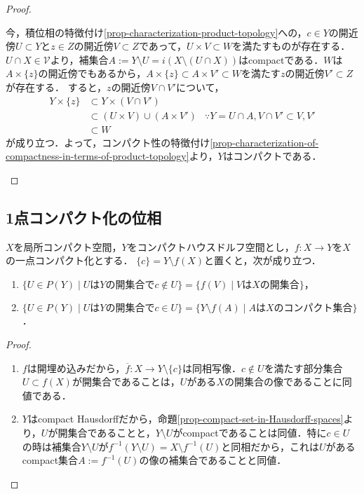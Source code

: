 \documentclass[uplatex,dvipdfmx]{jsreport}
\begin{document}
\begin{proof}
\begin{description}
\begin{description}
            今，積位相の特徴付け\ref{prop-characterization-product-topology}への，$c\in Y$の開近傍$U\subset Y$と$z\in Z$の開近傍$V\subset Z$であって，$U\times V\subset W$を満たすものが存在する．
            $U\cap X\in\mathcal{V}$より，補集合$A:=Y\setminus U=i(X\setminus(U\cap X))$はcompactである．$W$は$A\times\{z\}$の開近傍でもあるから，$A\times\{z\}\subset A\times V'\subset W$を満たす$z$の開近傍$V'\subset Z$が存在する．
            すると，$z$の開近傍$V\cap V'$について，
            \begin{align*}
                Y\times\{z\}&\subset Y\times(V\cap V')\\
                &\subset (U\times V)\cup(A\times V')&\because Y=U\cap A,V\cap V'\subset V,V'\\
                &\subset W
            \end{align*}
            が成り立つ．よって，コンパクト性の特徴付け\ref{prop-characterization-of-compactness-in-terms-of-product-topology}より，$Y$はコンパクトである．
        \end{description}
    \end{description}
\end{proof}



\subsection{1点コンパクト化の位相}

\begin{lemma}
    $X$を局所コンパクト空間，$Y$をコンパクトハウスドルフ空間とし，$f:X\to Y$を$X$の一点コンパクト化とする．
    $\{c\}=Y\setminus f(X)$と置くと，次が成り立つ．
    \begin{enumerate}
        \item $\{U\in P(Y)\mid UはYの開集合でc\notin U\}=\{f(V)\mid VはXの開集合\}$，
        \item $\{U\in P(Y)\mid UはYの開集合でc\in U\}=\{Y\setminus f(A)\mid AはXのコンパクト集合\}$．
    \end{enumerate}
\end{lemma}
\begin{proof}\mbox{}
    \begin{enumerate}
        \item $f$は開埋め込みだから，$\overline{f}:X\to Y\setminus\{c\}$は同相写像．$c\notin U$を満たす部分集合$U\subset f(X)$が開集合であることは，$U$がある$X$の開集合の像であることに同値である．
        \item $Y$はcompact Hausdorffだから，命題\ref{prop-compact-set-in-Hausdorff-spaces}より，$U$が開集合であることと，$Y\setminus U$がcompactであることは同値．特に$c\in U$の時は補集合$Y\setminus U$が$f^{-1}(Y\setminus U)=X\setminus f^{-1}(U)$と同相だから，これは$U$があるcompact集合$A:=f^{-1}(U)$の像の補集合であることと同値．
    \end{enumerate}
\end{proof}
\end{document}
